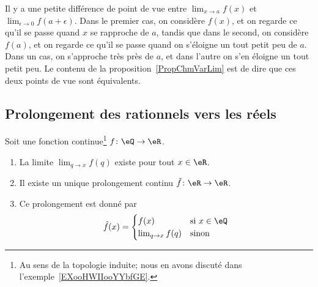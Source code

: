 Il y a une petite différence de point de vue entre $\lim_{x\to a}f(x)$ et $\lim_{\epsilon\to 0}f(a+\epsilon)$. Dans le premier cas, on considère $f(x)$, et on regarde ce qu'il se passe quand $x$ se rapproche de $a$, tandis que dans le second, on considère $f(a)$, et on regarde ce qu'il se passe quand on s'éloigne un tout petit peu de $a$. Dans un cas, on s'approche très près de $a$, et dans l'autre on s'en éloigne un tout petit peu. Le contenu de la proposition~\ref{PropChmVarLim} est de dire que ces deux points de vue sont équivalents.


\subsection{Prolongement des rationnels vers les réels}

\begin{lemma}        \label{LEMooUAFBooAwiXxj}
    Soit une fonction continue\footnote{Au sens de la topologie induite; nous en avons discuté dans l'exemple~\ref{EXooHWIIooYYbfGE}.} \( f\colon \eQ\to \eR\).
    \begin{enumerate}
        \item
            La limite \( \lim_{q\to x} f(q)\) existe pour tout \( x\in \eR\).
        \item
            Il existe un unique prolongement continu \( \tilde f\colon \eR\to \eR\).
        \item
            Ce prolongement est donné par
            \begin{equation}
            \tilde f(x)=\begin{cases}
                f(x)    &   \text{si } x\in \eQ\\
                \lim_{q\to x} f(q)    &    \text{sinon }
            \end{cases}
        \end{equation}
    \end{enumerate}
\end{lemma}


